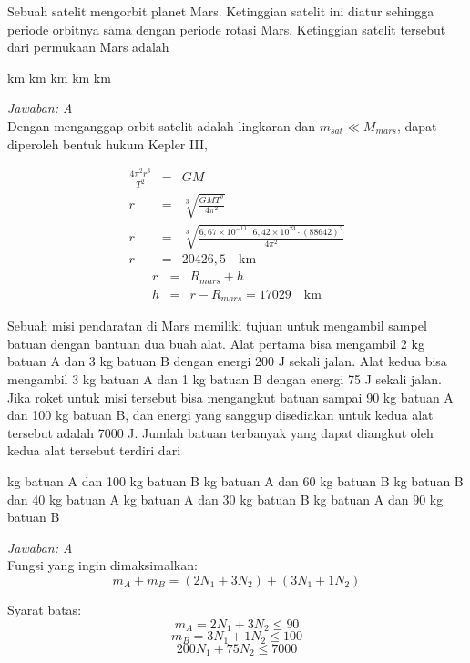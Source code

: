 \documentclass[11pt,fleqn]{exam}
\begin{document}
\begin{questions}
\question Sebuah satelit mengorbit planet Mars. Ketinggian satelit ini diatur sehingga periode orbitnya sama dengan periode rotasi Mars. Ketinggian satelit tersebut dari permukaan Mars adalah
\begin{choices}
 km
 km
 km
 km
 km
\end{choices}

\textit{Jawaban: A}\\

Dengan menganggap orbit satelit adalah lingkaran dan $m_{sat} \ll M_{mars}$, dapat diperoleh bentuk hukum Kepler III,

\begin{eqnarray*}
\frac{4 \pi^2 r^3}{T^2} &=& GM\\
r &=& \sqrt[3]{\frac{GM T^2}{4 \pi^2}}\\
r &=& \sqrt[3]{\frac{6,67 \times 10^{-11} \cdot 6,42 \times 10^{23} \cdot (88642)^2}{4 \pi^2}}\\
r &=& 20426,5\quad \text{km}
\end{eqnarray*}
\begin{eqnarray*}
r &=& R_{mars} + h\\
h &=& r - R_{mars} = 17029 \quad \text{km}  
\end{eqnarray*}



\question Sebuah misi pendaratan di Mars memiliki tujuan untuk mengambil sampel batuan dengan bantuan dua buah alat. Alat pertama bisa mengambil 2 kg batuan A dan 3 kg batuan B dengan energi 200 J sekali jalan. Alat kedua bisa mengambil 3 kg batuan A dan 1 kg batuan B dengan energi 75 J sekali jalan. Jika roket untuk misi tersebut bisa mengangkut batuan sampai 90 kg batuan A dan 100 kg batuan B, dan energi yang sanggup disediakan untuk kedua alat tersebut adalah 7000 J. Jumlah batuan terbanyak yang dapat diangkut oleh kedua alat tersebut terdiri dari
\begin{choices}
 kg batuan A dan 100 kg batuan B
 kg batuan A dan 60 kg batuan B
 kg batuan B dan 40 kg batuan A
 kg batuan A dan 30 kg batuan B
 kg batuan A dan 90 kg batuan B
\end{choices}

\textit{Jawaban: A}\\

Fungsi yang ingin dimaksimalkan:
$$m_A + m_B = (2N_1 + 3N_2) + (3N_1 + 1 N_2)$$

Syarat batas:
$$m_A = 2N_1 + 3N_2 \leq 90$$
$$m_B = 3N_1 + 1N_2 \leq 100$$
$$200 N_1 + 75 N_2 \leq 7000$$


\end{questions}
\end{document}
